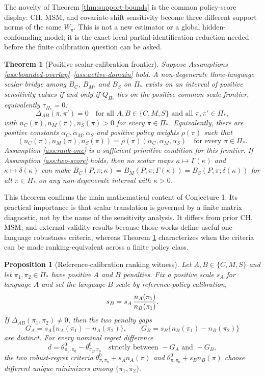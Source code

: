 \documentclass[11pt]{article}
\theoremstyle{definition}
\theoremstyle{plain}
\newtheorem{theorem}{Theorem}
\newtheorem{proposition}{Proposition}
\theoremstyle{remark}
\begin{document}
The novelty of Theorem \ref{thm:support-bounds} is the common policy-score display:
CH, MSM, and covariate-shift sensitivity become three different support norms of the
same $W_\pi$.  This is not a new estimator or a global hidden-confounding model; it is
the exact local partial-identification reduction needed before the finite calibration
question can be asked.

\begin{theorem}[Positive scalar-calibration frontier]\label{thm:calibration-frontier}
Suppose Assumptions \ref{ass:bounded-overlap}--\ref{ass:active-domain} hold.  A
non-degenerate three-language scalar bridge among $B_C$, $B_M$, and $B_S$ on
$\Pi_\ast$ exists on an interval of positive sensitivity values if and only if
$Q_{\Pi_\ast}$ lies on the positive common-scale frontier, equivalently
$\tau_{\Pi_\ast}=0$:
\[
  \Delta_{AB}(\pi,\pi')=0
  \quad\text{for all }A,B\in\{C,M,S\}\text{ and all }\pi,\pi'\in\Pi_\ast,
\]
with $n_C(\pi),n_M(\pi),n_S(\pi)>0$ for every $\pi\in\Pi_\ast$.  Equivalently,
there are positive constants $\alpha_C,\alpha_M,\alpha_S$ and positive policy weights
$\rho(\pi)$ such that
\[
  (n_C(\pi),n_M(\pi),n_S(\pi))
  =\rho(\pi)(\alpha_C,\alpha_M,\alpha_S)
  \quad\text{for every }\pi\in\Pi_\ast.
\]
Assumption \ref{ass:rank-one} is a sufficient primitive condition for this frontier.
If Assumption \ref{ass:two-score} holds, then no scalar maps
$\kappa\mapsto\Gamma(\kappa)$ and $\kappa\mapsto\delta(\kappa)$ can make
$B_C(P,\pi;\kappa)=B_M(P,\pi;\Gamma(\kappa))=B_S(P,\pi;\delta(\kappa))$ for all
$\pi\in\Pi_\ast$ on any non-degenerate interval with $\kappa>0$.
\end{theorem}

This theorem confirms the main mathematical content of Conjecture 1.  Its practical
importance is that scalar translation is governed by a finite matrix diagnostic, not by
the name of the sensitivity analysis.  It differs from prior CH, MSM, and external
validity results because those works define useful one-language robustness criteria,
whereas Theorem \ref{thm:calibration-frontier} characterizes when the criteria can be
made ranking-equivalent across a finite policy class.

\begin{proposition}[Reference-calibration ranking witness]\label{prop:ranking-witness}
Let $A,B\in\{C,M,S\}$ and let $\pi_1,\pi_2\in\Pi_\ast$ have positive $A$ and $B$
penalties.  Fix a positive scale $s_A$ for language $A$ and set the language-$B$
scale by reference-policy calibration,
\[
  s_B=s_A\,{n_A(\pi_1)\over n_B(\pi_1)}.
\]
If $\Delta_{AB}(\pi_1,\pi_2)\ne0$, then the two penalty gaps
\[
  G_A=s_A\{n_A(\pi_1)-n_A(\pi_2)\},\qquad
  G_B=s_B\{n_B(\pi_1)-n_B(\pi_2)\}
\]
are distinct.  For every nominal regret difference
\[
  d=\theta^0_{\pi_1,\pi_0}-\theta^0_{\pi_2,\pi_0}
  \quad\text{strictly between }-G_A\text{ and }-G_B,
\]
the two robust-regret criteria
$\theta^0_{\pi,\pi_0}+s_A n_A(\pi)$ and
$\theta^0_{\pi,\pi_0}+s_B n_B(\pi)$ choose different unique minimizers among
$\{\pi_1,\pi_2\}$.
\end{proposition}
\end{document}
